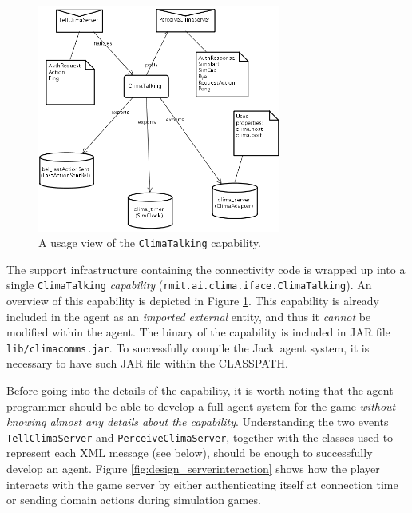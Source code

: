 \documentclass[10pt]{article}
\newcommand{\propername}[1]{\mbox{\sf #1}\xspace}
\newcommand{\JACK}{\propername{Jack}}
\newcommand{\JDE}{\propername{JDE}}
\begin{document}
\begin{figure}
\begin{center}
\includegraphics[width=8cm]{ClimaTalking_usage}
\end{center}
\caption{A usage view of the \texttt{ClimaTalking} capability.}
\label{fig:design_climatalking}
\end{figure}

The support infrastructure containing the connectivity code is wrapped up into a
single \texttt{ClimaTalking} \textit{capability}
(\texttt{rmit.ai.clima.iface.ClimaTalking}).
%
An overview of this capability is depicted in
Figure \ref{fig:design_climatalking}.
%
This capability is already included in the agent as an \textit{imported
external} entity, and thus it \textit{cannot} be modified within the
agent. The binary of the capability is included in JAR file
\texttt{lib/climacomms.jar}. To successfully compile the \JACK\ agent system, it
is necessary to have such JAR file within the CLASSPATH. 
% 





Before going into the details of the capability, it is worth noting that the
agent programmer should be able to develop a full agent system for the 
game \textit{without knowing almost any details about the capability}.
%
Understanding the two events \texttt{TellClimaServer} and
\texttt{PerceiveClimaServer}, together with the classes used to represent each
XML message (see below), should be enough to successfully develop an agent.
%
Figure \ref{fig:design_serverinteraction} shows how the player interacts with
the game server by either authenticating itself at connection time or sending
domain actions during simulation games.
\end{document}
